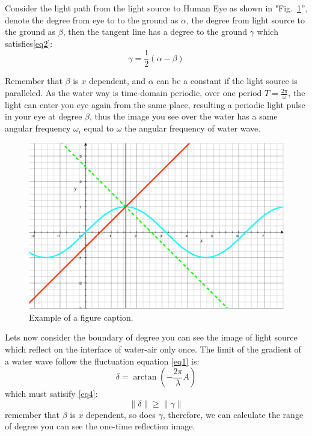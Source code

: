 \documentclass[conference]{IEEEtran}
\begin{document}
Consider the light path from the light source to Human Eye as shown in "Fig.~\ref{fig01}'', denote the degree from eye to to the ground as $\alpha$, the degree from light source to the ground as $\beta$, then the tangent line has a degree to the ground $\gamma$ which satisfies\eqref{eq2}:
\begin{equation}
\gamma = \frac{1}{2} (\alpha-\beta)\label{eq2}
\end{equation}

Remember that $\beta$ is $x$ dependent, and $\alpha$ can be a constant if the light source is paralleled. As the water way is time-domain periodic, over one period $T=\frac{2\pi}{\omega}$, the light can enter you eye again from the same place, resulting a periodic light pulse in your eye at degree $\beta$, thus the image you see over the water has a same angular frequency $\omega_i$ equal to $\omega$ the angular frequency of water wave. \\

\begin{figure}[htbp]
\includegraphics[width=\linewidth]{fig/reflect_onwave_single.pdf}
\caption{Example of a figure caption.}
\label{fig01}
\end{figure}

Lets now consider the boundary of degree you can see the image of light source which reflect on the interface of water-air only once. The limit of the gradient of a water wave follow the fluctuation equation \eqref{eq1} is:
\begin{equation}
\delta = \arctan \left( -\frac{2\pi}{\lambda} A \right)
\end{equation}
which must satisify \eqref{eq4}:
\begin{equation}
\|\delta\| \geq \|\gamma\|\label{eq4}
\end{equation}
remember that $\beta$ is $x$ dependent, so does $\gamma$, therefore, we can calculate the range of degree you can see the one-time reflection image. \\
\end{document}
